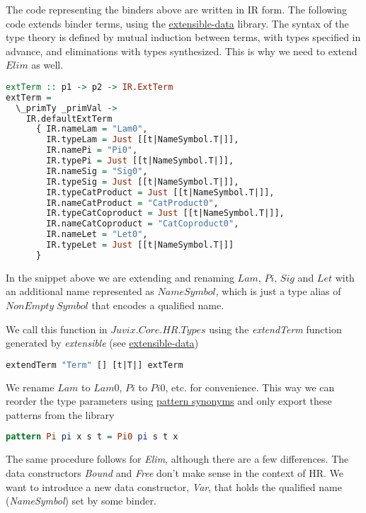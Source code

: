 \documentclass[acmsmall]{acmart}
\numberwithin{figure}{subsection}
\begin{document}
The code representing the binders above are written in IR form.
The following code extends binder terms, using the \href{https://heliaxdev.github.io/extensible-data/Extensible.html}{extensible-data} library. The syntax of the type theory is defined by mutual induction between terms, with types specified in advance, and eliminations with types synthesized. This is why we need to extend $Elim$ as well.

\begin{lstlisting}[language=haskell]
extTerm :: p1 -> p2 -> IR.ExtTerm
extTerm =
  \_primTy _primVal ->
    IR.defaultExtTerm
      { IR.nameLam = "Lam0",
        IR.typeLam = Just [[t|NameSymbol.T|]],
        IR.namePi = "Pi0",
        IR.typePi = Just [[t|NameSymbol.T|]],
        IR.nameSig = "Sig0",
        IR.typeSig = Just [[t|NameSymbol.T|]],
        IR.typeCatProduct = Just [[t|NameSymbol.T|]],
        IR.nameCatProduct = "CatProduct0",
        IR.typeCatCoproduct = Just [[t|NameSymbol.T|]],
        IR.nameCatCoproduct = "CatCoproduct0",
        IR.nameLet = "Let0",
        IR.typeLet = Just [[t|NameSymbol.T|]]
      }
\end{lstlisting}

In the snippet above we are extending and renaming $Lam$, $Pi$, $Sig$ and $Let$ with an additional name represented as $NameSymbol$, which is just a type alias of $NonEmpty \; Symbol$ that encodes a qualified name.

We call this function in $Juvix.Core.HR.Types$ using the \textit{extendTerm} function generated by \textit{extensible} (see \href{https://heliaxdev.github.io/extensible-data/Extensible.html}{extensible-data})

\begin{lstlisting}[language=haskell]
extendTerm "Term" [] [t|T|] extTerm
\end{lstlisting}

We rename $Lam$ to $Lam0$, $Pi$ to $Pi0$, etc. for convenience. This way we can reorder the type parameters using \href{https://ghc.gitlab.haskell.org/ghc/doc/users_guide/exts/pattern_synonyms.html}{pattern synonyms} and only export these patterns from the library


\begin{lstlisting}[language=haskell]
pattern Pi pi x s t = Pi0 pi s t x
\end{lstlisting}

The same procedure follows for \textit{Elim}, although there are a few differences. The data constructors \textit{Bound} and \textit{Free} don't make sense in the context of HR. We want to introduce a new data constructor, \textit{Var}, that holds the qualified name (\textit{NameSymbol}) set by some binder.
\end{document}
